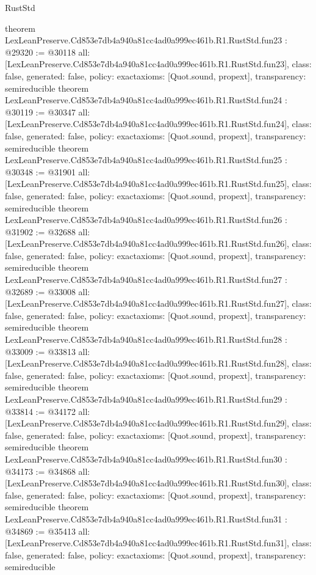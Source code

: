 \begin{lexlean}{RustStd}
\begin{coremodule}
{}
theorem LexLeanPreserve.Cd853e7db4a940a81cc4ad0a999ec461b.R1.RustStd.fun23 : @29320 := @30118 {
  all: [LexLeanPreserve.Cd853e7db4a940a81cc4ad0a999ec461b.R1.RustStd.fun23],
  class: false,
  generated: false,
  policy: exact{axioms: [Quot.sound, propext]},
  transparency: semireducible
}
theorem LexLeanPreserve.Cd853e7db4a940a81cc4ad0a999ec461b.R1.RustStd.fun24 : @30119 := @30347 {
  all: [LexLeanPreserve.Cd853e7db4a940a81cc4ad0a999ec461b.R1.RustStd.fun24],
  class: false,
  generated: false,
  policy: exact{axioms: [Quot.sound, propext]},
  transparency: semireducible
}
theorem LexLeanPreserve.Cd853e7db4a940a81cc4ad0a999ec461b.R1.RustStd.fun25 : @30348 := @31901 {
  all: [LexLeanPreserve.Cd853e7db4a940a81cc4ad0a999ec461b.R1.RustStd.fun25],
  class: false,
  generated: false,
  policy: exact{axioms: [Quot.sound, propext]},
  transparency: semireducible
}
theorem LexLeanPreserve.Cd853e7db4a940a81cc4ad0a999ec461b.R1.RustStd.fun26 : @31902 := @32688 {
  all: [LexLeanPreserve.Cd853e7db4a940a81cc4ad0a999ec461b.R1.RustStd.fun26],
  class: false,
  generated: false,
  policy: exact{axioms: [Quot.sound, propext]},
  transparency: semireducible
}
theorem LexLeanPreserve.Cd853e7db4a940a81cc4ad0a999ec461b.R1.RustStd.fun27 : @32689 := @33008 {
  all: [LexLeanPreserve.Cd853e7db4a940a81cc4ad0a999ec461b.R1.RustStd.fun27],
  class: false,
  generated: false,
  policy: exact{axioms: [Quot.sound, propext]},
  transparency: semireducible
}
theorem LexLeanPreserve.Cd853e7db4a940a81cc4ad0a999ec461b.R1.RustStd.fun28 : @33009 := @33813 {
  all: [LexLeanPreserve.Cd853e7db4a940a81cc4ad0a999ec461b.R1.RustStd.fun28],
  class: false,
  generated: false,
  policy: exact{axioms: [Quot.sound, propext]},
  transparency: semireducible
}
theorem LexLeanPreserve.Cd853e7db4a940a81cc4ad0a999ec461b.R1.RustStd.fun29 : @33814 := @34172 {
  all: [LexLeanPreserve.Cd853e7db4a940a81cc4ad0a999ec461b.R1.RustStd.fun29],
  class: false,
  generated: false,
  policy: exact{axioms: [Quot.sound, propext]},
  transparency: semireducible
}
theorem LexLeanPreserve.Cd853e7db4a940a81cc4ad0a999ec461b.R1.RustStd.fun30 : @34173 := @34868 {
  all: [LexLeanPreserve.Cd853e7db4a940a81cc4ad0a999ec461b.R1.RustStd.fun30],
  class: false,
  generated: false,
  policy: exact{axioms: [Quot.sound, propext]},
  transparency: semireducible
}
theorem LexLeanPreserve.Cd853e7db4a940a81cc4ad0a999ec461b.R1.RustStd.fun31 : @34869 := @35413 {
  all: [LexLeanPreserve.Cd853e7db4a940a81cc4ad0a999ec461b.R1.RustStd.fun31],
  class: false,
  generated: false,
  policy: exact{axioms: [Quot.sound, propext]},
  transparency: semireducible
}
\end{coremodule}
\end{lexlean}
